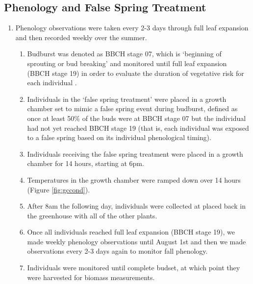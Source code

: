 \documentclass{article}\usepackage[]{graphicx}\usepackage[]{color}
\begin{document}
\subsection*{Phenology and False Spring Treatment}
\begin{enumerate}
\item Phenology observations were taken every 2-3 days through full leaf expansion and then recorded weekly over the summer. 
  \begin{enumerate}
  \item Budburst was denoted as BBCH stage 07, which is `beginning of sprouting or bud breaking' and monitored until full leaf expansion (BBCH stage 19) in order to evaluate the duration of vegetative risk \citep{Chamberlain2019} for each individual \citep{Finn2007}.
  \item Individuals in the `false spring treatment' were placed in a growth chamber set to mimic a false spring event during budburst, defined as once at least 50\% of the buds were at BBCH stage 07 but the individual had not yet reached BBCH stage 19 (that is, each individual was exposed to a false spring based on its individual phenological timing). 
  \item Individuals receiving the false spring treatment were placed in a growth chamber for 14 hours, starting at 6pm. 
  \item Temperatures in the growth chamber were ramped down over 14 hours (Figure \ref{fig:gccond}).
  \item After 8am the following day, individuals were collected at placed back in the greenhouse with all of the other plants. 
  \item Once all individuals reached full leaf expansion (BBCH stage 19), we made weekly phenology observations until August 1st and then we made observations every 2-3 days again to monitor fall phenology.
  \item Individuals were monitored until complete budset, at which point they were harvested for biomass measurements.
  \end{enumerate}
\end{enumerate}
\end{document}
